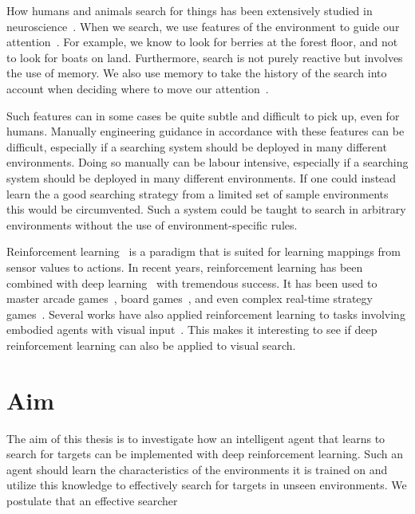 How humans and animals search for things has been extensively studied in neuroscience~\cite{eckstein_visual_2011,wolfe_visual_2010,nakayama_situating_2011}.
When we search, we use features of the environment to guide our attention~\cite{wolfe_five_2017,eckstein_visual_2011}.
For example, we know to look for berries at the forest floor, and not to look for boats on land.
Furthermore, search is not purely reactive but involves the use of memory.
We also use memory to take the history of the search into account when deciding where to move our attention~\cite{wolfe_five_2017}.

Such features can in some cases be quite subtle and difficult to pick up, even for humans.
Manually engineering guidance in accordance with these features can be difficult,
especially if a searching system should be deployed in many different environments.
Doing so manually can be labour intensive, especially if a searching system should be deployed in many different environments.
If one could instead learn the a good searching strategy from a limited set of sample environments this would be circumvented.
Such a system could be taught to search in arbitrary environments without the use of environment-specific rules.

Reinforcement learning~\cite{sutton_reinforcement_2018} is a paradigm that is suited for learning mappings from sensor values to actions.
In recent years, reinforcement learning has been combined with deep learning~\cite{goodfellow_deep_2016} with tremendous success.
It has been used to master arcade games~\cite{mnih_human_2015}, board games~\cite{silver_alphago_2016}, and even complex real-time strategy games~\cite{vinyals_alphastar_2019}.
Several works have also applied reinforcement learning to tasks involving embodied agents with visual input~\cite{minut_mahadevan_2001,mnih_attention_2014,zhu_target_driven_2016,mirowski_navigate_2017}.
This makes it interesting to see if deep reinforcement learning can also be applied to visual search.

\section{Aim}
\label{sec:aim}

The aim of this thesis is to investigate how an intelligent agent that learns to search for targets can be implemented with deep reinforcement learning.
Such an agent should learn the characteristics of the environments it is trained on and utilize this knowledge to effectively search for targets in unseen environments.
We postulate that an effective searcher 

